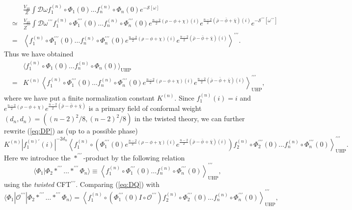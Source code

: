 \documentclass[a4paper,12pt]{article}
\newcommand{\cD}{\mathcal{D}}
\newcommand{\cO}{\mathcal{O}}
\newcommand{\cS}{\mathcal{S}}
\newcommand{\tp}{\prime\prime\prime}
\begin{document}
\begin{eqnarray}
& &\frac{V_{10}}{Z}\int\cD\omega f^{(n)}_1\circ\Phi_1(0)\ldots f^{(n)}_n\circ\Phi_n(0)e^{-\cS[\omega]}
\nonumber \\ &\simeq& \frac{V_{10}}{Z^{\tp}}\int\cD\omega^{\tp}f^{(n)}_1\circ\Phi_1^{\tp}(0)
\ldots f^{(n)}_n\circ\Phi_n^{\tp}(0)e^{\frac{n-2}{2}(\rho-\phi+\chi)(i)}
e^{\frac{n-2}{2}(\bar{\rho}-\bar{\phi}+\bar{\chi})(i)}
e^{-\cS^{\tp}[\omega^{\tp}]} \nonumber \\
&=&\left\langle f^{(n)}_1\circ\Phi_1^{\tp}(0)\ldots f^{(n)}_n\circ\Phi_n^{\tp}(0)
e^{\frac{n-2}{2}(\rho-\phi+\chi)(i)}e^{\frac{n-2}{2}
(\bar{\rho}-\bar{\phi}+\bar{\chi})(i)}\right\rangle^{\tp}. \label{eq:DO}
\end{eqnarray}
Thus we have obtained 
\begin{eqnarray}
& &\langle f^{(n)}_1\circ\Phi_1(0)\ldots f^{(n)}_n\circ\Phi_n(0)\rangle_{\mathrm{UHP}} \nonumber \\
&=&K^{(n)}
\left\langle f^{(n)}_1\circ\Phi_1^{\tp}(0)\ldots f^{(n)}_n\circ\Phi_n^{\tp}(0)
e^{\frac{n-2}{2}(\rho-\phi+\chi)(i)}e^{\frac{n-2}{2}
(\bar{\rho}-\bar{\phi}+\bar{\chi})(i)}\right\rangle^{\tp}_{\mathrm{UHP}}, \label{eq:DP}
\end{eqnarray}
where we have put a finite normalization constant $K^{(n)}$. 
Since $f^{(n)}_1(i)=i$ and 
$e^{\frac{n-2}{2}(\rho-\phi+\chi)}e^{\frac{n-2}{2}(\bar{\rho}-\bar{\phi}+\bar{\chi})}$ 
is a primary field of conformal weight $(d_n,d_n)=((n-2)^2/8,(n-2)^2/8)$ in the 
twisted theory, we can further rewrite (\ref{eq:DP}) as (up to a possible phase) 
\begin{equation}
K^{(n)}|f^{(n)\prime}_1(i)|^{-2d_n}\left\langle f_1^{(n)}\circ\left(\Phi^{\tp}_1(0)
e^{\frac{n-2}{2}(\rho-\phi+\chi)(i)}e^{\frac{n-2}{2}(
\bar{\rho}-\bar{\phi}+\bar{\chi})(i)}\right) f_2^{(n)}\circ\Phi_2^{\tp}(0)\ldots f_n^{(n)}\circ
\Phi^{\tp}_n(0)\right\rangle_{\mathrm{UHP}}^{\tp}. \label{eq:DQ}
\end{equation}
Here we introduce the $*^{\tp}$-product by the following relation 
\begin{equation}
\langle\Phi_1|\Phi_2*^{\tp}\ldots*^{\tp}\Phi_n\rangle\equiv\left\langle f_1^{(n)}\circ\Phi_1^{\tp}
(0)\ldots f_n^{(n)}\circ\Phi^{\tp}_n(0)\right\rangle^{\tp}_{\mathrm{UHP}}, \label{eq:DR}
\end{equation}
using the \textit{twisted} CFT$^{\tp}$. Comparing (\ref{eq:DQ}) with
\[ \langle\Phi_1|\cO^{\tp}|\Phi_2*^{\tp}\ldots *^{\tp}\Phi_n\rangle=\left\langle
f_1^{(n)}\circ\left(\Phi_1^{\tp}(0)I\circ\cO^{\tp}\right) f_2^{(n)}\circ\Phi_2^{\tp}(0)
\ldots f_n^{(n)}\circ\Phi_n^{\tp}(0)\right\rangle^{\tp}_{\mathrm{UHP}}, \]
\end{document}
